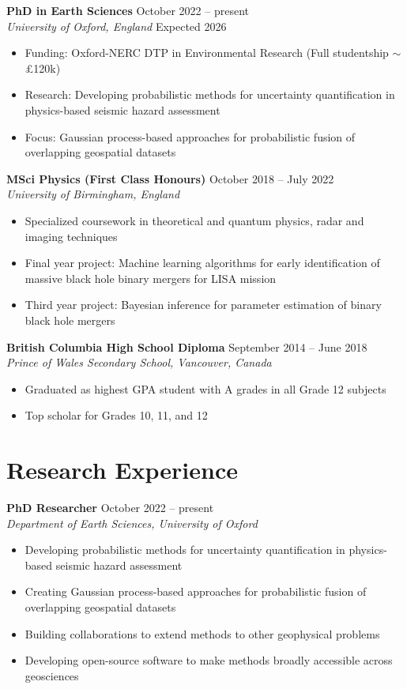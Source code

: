 \documentclass[11pt,a4paper]{article}
\newcommand{\cventry}[4]{%
    \noindent\textbf{#1} \hfill #2\\
    \textit{#3} \hfill #4\\[0.1em]
}
\begin{document}
\cventry{PhD in Earth Sciences}{October 2022 -- present}{University of Oxford, England}{Expected 2026}
\begin{itemize}
    \item Funding: Oxford-NERC DTP in Environmental Research (Full studentship $\sim$£120k)
    \item Research: Developing probabilistic methods for uncertainty quantification in physics-based seismic hazard assessment
    \item Focus: Gaussian process-based approaches for probabilistic fusion of overlapping geospatial datasets
\end{itemize}

\cventry{MSci Physics (First Class Honours)}{October 2018 -- July 2022}{University of Birmingham, England}{}
\begin{itemize}
    \item Specialized coursework in theoretical and quantum physics, radar and imaging techniques
    \item Final year project: Machine learning algorithms for early identification of massive black hole binary mergers for LISA mission
    \item Third year project: Bayesian inference for parameter estimation of binary black hole mergers
\end{itemize}

\cventry{British Columbia High School Diploma}{September 2014 -- June 2018}{Prince of Wales Secondary School, Vancouver, Canada}{}
\begin{itemize}
    \item Graduated as highest GPA student with A grades in all Grade 12 subjects
    \item Top scholar for Grades 10, 11, and 12
\end{itemize}

\section*{Research Experience}

\cventry{PhD Researcher}{October 2022 -- present}{Department of Earth Sciences, University of Oxford}{}
\begin{itemize}
    \item Developing probabilistic methods for uncertainty quantification in physics-based seismic hazard assessment
    \item Creating Gaussian process-based approaches for probabilistic fusion of overlapping geospatial datasets
    \item Building collaborations to extend methods to other geophysical problems
    \item Developing open-source software to make methods broadly accessible across geosciences
\end{itemize}
\end{document}
